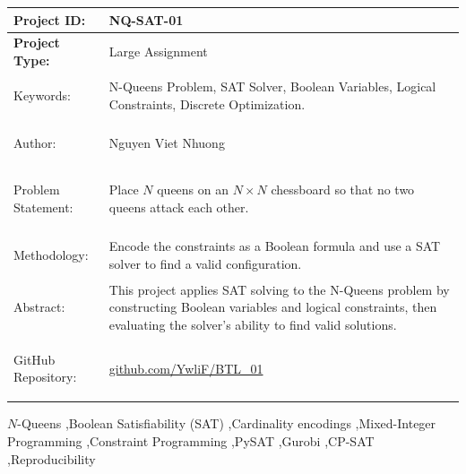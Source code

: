 \documentclass[a4paper,fleqn]{cas-sc}
\begin{document}
\noindent
\begin{tabularx}{\textwidth}{
    |>{\raggedright\arraybackslash
    \color{TitleBlue}\bfseries}p{}
    |>{\raggedright\arraybackslash
    \color{TextBlue}}X|
}
\hline

\rowcolor{RowGray}
Project ID: & NQ-SAT-01 \\
\hline

Project Type: & Large Assignment \\
\hline

Keywords: &
N-Queens Problem, SAT Solver, Boolean Variables,
Logical Constraints, Discrete Optimization. \\
\hline

Author: & Nguyen Viet Nhuong \\
\hline

Problem Statement: &
Place $N$ queens on an $N \times N$ chessboard
so that no two queens attack each other. \\
\hline

Methodology: &
Encode the constraints as a Boolean formula and use
a SAT solver to find a valid configuration. \\
\hline

Abstract: &
This project applies SAT solving to the N-Queens
problem by constructing Boolean variables and logical
constraints, then evaluating the solver's ability
to find valid solutions. \\
\hline

GitHub Repository: &
\href{https://github.com/YwliF/BTL_01}
{\textcolor{TextBlue}{github.com/YwliF/BTL\_01}} \\
\hline

\end{tabularx}

\clearpage
{}
\setcounter{page}{1}

\begin{keywords}
$N$-Queens \sep Boolean Satisfiability (SAT) \sep Cardinality encodings \sep Mixed-Integer Programming \sep Constraint Programming \sep PySAT \sep Gurobi \sep CP-SAT \sep Reproducibility
\end{keywords}

\maketitle

\pagestyle{fancy}
\fancyhf{}
\fancyfoot[C]{\thepage\ / \pageref{LastPage}}
\thispagestyle{fancy}
\end{document}
